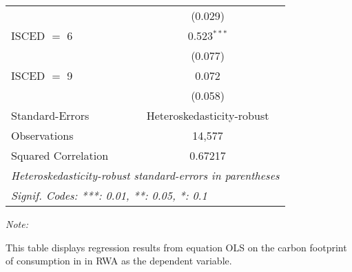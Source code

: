 \begin{table}[htbp!]
\begin{adjustbox}{width = 1\textwidth, max height = 0.95\textheight, center}
\begin{threeparttable}[b]
\begin{tabular}{lc}
                                & (0.029)\\   
            ISCED $=$ 6         & 0.523$^{***}$\\   
                                & (0.077)\\   
            ISCED $=$ 9         & 0.072\\   
                                & (0.058)\\   
            \midrule 
            Standard-Errors     & Heteroskedasticity-robust \\   
            Observations        & 14,577\\  
            Squared Correlation & 0.67217\\  
            \midrule \midrule
            \multicolumn{2}{l}{\emph{Heteroskedasticity-robust standard-errors in parentheses}}\\
            \multicolumn{2}{l}{\emph{Signif. Codes: ***: 0.01, **: 0.05, *: 0.1}}\\
         \end{tabular}
         
         \begin{tablenotes}\item \medskip \textit{Note:}
            \item This table displays regression results from equation OLS on the carbon footprint of consumption in  in RWA as the dependent variable.  
         \end{tablenotes}
      \end{threeparttable}
   \end{adjustbox}
\end{table}


